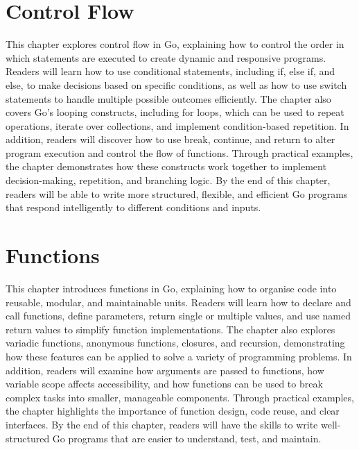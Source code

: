 \documentclass[12pt,oneside]{book}
\begin{document}
\chapter{Control Flow}
\begin{chaptersummary}
This chapter explores control flow in Go, explaining how to control the order in which statements are executed to create dynamic and responsive programs. Readers will learn how to use conditional statements, including if, else if, and else, to make decisions based on specific conditions, as well as how to use switch statements to handle multiple possible outcomes efficiently. The chapter also covers Go’s looping constructs, including for loops, which can be used to repeat operations, iterate over collections, and implement condition-based repetition. In addition, readers will discover how to use break, continue, and return to alter program execution and control the flow of functions. Through practical examples, the chapter demonstrates how these constructs work together to implement decision-making, repetition, and branching logic. By the end of this chapter, readers will be able to write more structured, flexible, and efficient Go programs that respond intelligently to different conditions and inputs.
\end{chaptersummary}


\chapter{Functions}
\begin{chaptersummary}
This chapter introduces functions in Go, explaining how to organise code into reusable, modular, and maintainable units. Readers will learn how to declare and call functions, define parameters, return single or multiple values, and use named return values to simplify function implementations. The chapter also explores variadic functions, anonymous functions, closures, and recursion, demonstrating how these features can be applied to solve a variety of programming problems. In addition, readers will examine how arguments are passed to functions, how variable scope affects accessibility, and how functions can be used to break complex tasks into smaller, manageable components. Through practical examples, the chapter highlights the importance of function design, code reuse, and clear interfaces. By the end of this chapter, readers will have the skills to write well-structured Go programs that are easier to understand, test, and maintain.
\end{chaptersummary}

\end{document}
